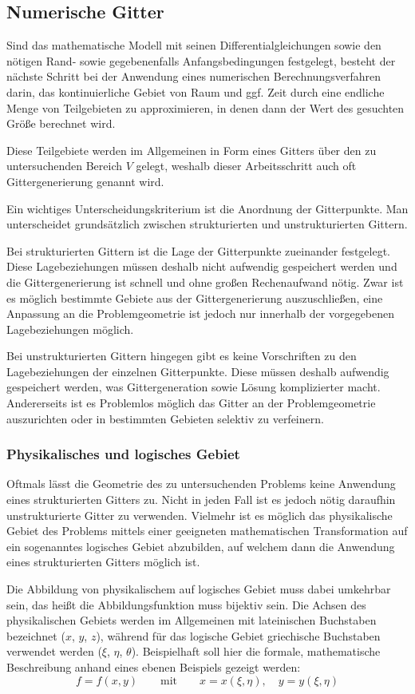 \subsection{Numerische Gitter}
\label{sec:num_gitter}

Sind das mathematische Modell mit seinen Differentialgleichungen sowie den nötigen
Rand- sowie gegebenenfalls Anfangsbedingungen festgelegt, besteht der nächste Schritt
bei der Anwendung eines numerischen Berechnungsverfahren darin, das kontinuierliche
Gebiet von Raum und ggf. Zeit durch eine endliche Menge von Teilgebieten zu approximieren,
in denen dann der Wert des gesuchten Größe berechnet wird.

Diese Teilgebiete werden im Allgemeinen in Form eines Gitters über den zu untersuchenden
Bereich $V$ gelegt, weshalb dieser Arbeitsschritt auch oft Gittergenerierung genannt wird.

Ein wichtiges Unterscheidungskriterium ist die Anordnung der Gitterpunkte.
Man unterscheidet grundsätzlich zwischen strukturierten und unstrukturierten Gittern.

Bei strukturierten Gittern ist die Lage der Gitterpunkte zueinander festgelegt. Diese
Lagebeziehungen müssen deshalb nicht aufwendig gespeichert werden und die Gittergenerierung
ist schnell und ohne großen Rechenaufwand nötig. Zwar ist es möglich bestimmte Gebiete
aus der Gittergenerierung auszuschließen, eine Anpassung an die Problemgeometrie ist
jedoch nur innerhalb der vorgegebenen Lagebeziehungen möglich.

Bei unstrukturierten Gittern hingegen gibt es keine Vorschriften zu den Lagebeziehungen
der einzelnen Gitterpunkte. Diese müssen deshalb aufwendig gespeichert werden, was
Gittergeneration sowie Lösung komplizierter macht. Andererseits ist es Problemlos möglich
das Gitter an der Problemgeometrie auszurichten oder in bestimmten Gebieten selektiv zu verfeinern.

\subsubsection{Physikalisches und logisches Gebiet}

Oftmals lässt die Geometrie des zu untersuchenden Problems keine Anwendung eines
strukturierten Gitters zu. Nicht in jeden Fall ist es jedoch nötig daraufhin unstrukturierte
Gitter zu verwenden. Vielmehr ist es möglich das physikalische Gebiet des Problems
mittels einer geeigneten mathematischen Transformation auf ein sogenanntes
logisches Gebiet abzubilden, auf welchem dann die Anwendung eines strukturierten Gitters
möglich ist.

Die Abbildung von physikalischem auf logisches Gebiet muss dabei umkehrbar sein, das heißt
die Abbildungsfunktion muss bijektiv sein. Die Achsen des physikalischen Gebiets
werden im Allgemeinen mit lateinischen Buchstaben bezeichnet ($x$, $y$, $z$), während
für das logische Gebiet griechische Buchstaben verwendet werden ($\xi$, $\eta$, $\theta$).
Beispielhaft soll hier die formale, mathematische Beschreibung anhand eines ebenen
Beispiels gezeigt werden:
\begin{equation}
  f=f(x, y)\qquad \text{mit} \qquad x=x(\xi, \eta),\quad y=y(\xi, \eta)
\end{equation}


